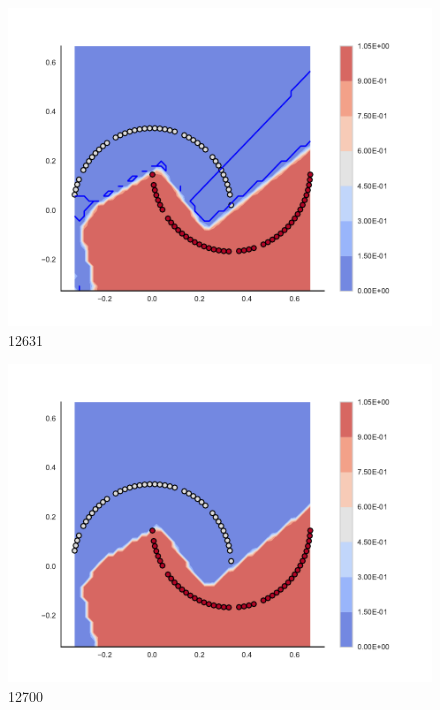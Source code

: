 \begin{subfigure}[b]{0.09\textwidth}
    \includegraphics[clip, trim=2.35cm 1.75cm 4.5cm 0cm,width=\textwidth]{img/convergence/12631.pdf}
    \caption{12631}
    \label{fig:convergence_12631}
\end{subfigure}
%
\begin{subfigure}[b]{0.09\textwidth}
    \includegraphics[clip, trim=2.35cm 1.75cm 4.5cm 0cm,width=\textwidth]{img/convergence/12700.pdf}
    \caption{12700}
    \label{fig:convergence_12700}
\end{subfigure}
%
